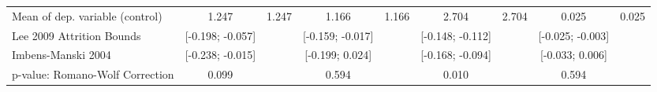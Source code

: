 {\begin{tabular}{l*{8}{c}}
Mean of dep. variable (control)                   &       1.247         &       1.247         &       1.166         &       1.166         &       2.704         &       2.704         &       0.025         &       0.025         \\
Lee 2009 Attrition Bounds                         &[-0.198; -0.057]         &                     &[-0.159; -0.017]         &                     &[-0.148; -0.112]         &                     &[-0.025; -0.003]         &                     \\
Imbens-Manski 2004                                &[-0.238; -0.015]         &                     &[-0.199; 0.024]         &                     &[-0.168; -0.094]         &                     &[-0.033; 0.006]         &                     \\
p-value: Romano-Wolf Correction                   &       0.099         &                     &       0.594         &                     &       0.010         &                     &       0.594         &                     \\
\hline\hline
\end{tabular}
}
